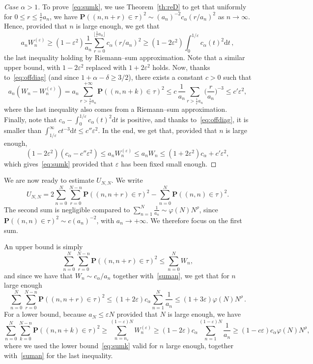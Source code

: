 \documentclass[AHL,Unicode,longabstracts]{cedram}
\newenvironment{step}[1]{\begin{proof}[#1]}{\let\qed\relax\end{proof}}
\newcommand{\ga}{\alpha}
\newcommand{\gd}{\delta}
\newcommand{\gep}{\varepsilon}
\newcommand{\dd}{\mathrm{d}}
\newcommand{\bP}{\ensuremath{\mathbf{P}}}
\begin{document}
\begin{appendix}
\begin{proofc}
\begin{step}{Case $\ga > 1$}
To prove~\eqref{eq:sumk}, we use Theorem~\ref{th:reD} to get that uniformly for $0\leq r\leq \tfrac 1\gep a_n$, we have $\bP((n,n+r) \in \tau)^2 \sim (a_n)^{-2} c_{\ga}(r/a_n)^2$ as $n\to\infty$. Hence, provided that $n$ is large enough, we get that
\[
a_n W_n^{(\gep)} \geq (1-\gep^2) \frac{1}{a_n} \sum_{r=0}^{\lfloor\frac1\gep a_n \rfloor} c_{\ga}(r/a_n)^2 \geq (1-2\gep^2) \int_{0}^{1/\gep} c_{\ga}(t)^2 \dd t\,,
\]
the last inequality holding by Riemann--sum approximation. Note that a similar upper bound, with $1-2\gep^2$ replaced with $1+2\gep^2$ holds. Now, thanks to~\eqref{eq:offdiag} (and since $1+\ga-\gd \geq 3/2$), there exists a constant $c>0$ such that
\[
a_n(W_n-W_n^{(\gep)}) = a_n \sum_{r > \frac1\gep a_n}^{+\infty} \bP((n,n+k) \in \tau)^2 \leq c\,\frac{1}{a_n} \sum_{r>\frac1\gep a_n} \Big(\frac{r}{a_n} \Big)^{-3} \leq c' \gep^2,
\]
where the last inequality also comes from a Riemann--sum approximation. Finally, note that $c_\ga -\int_{0}^{1/\gep} c_{\ga}(t)^2 \dd t $ is positive, and thanks to~\eqref{eq:offdiag}, it is smaller than $\int_{1/\gep}^{\infty} c t^{-3} \dd t \leq c'' \gep^2$. In the end, we get that, provided that $n$ is large enough,
\begin{equation}
(1-2\gep^2) (c_{\ga} - c'' \gep^2) \leq a_n W_n^{(\gep)} \leq a_n W_n \leq (1+2\gep^2) c_{\ga} + c' \gep^2,
\end{equation}
which gives~\eqref{eq:sumk} provided that $\gep$ has been fixed small enough.
\end{step}

We are now ready to estimate $U_{N,N}$. We write
\[
U_{N,N} = 2\sum_{n=0}^{N} \sum_{r=0}^{N-n} \bP((n,n+r) \in\tau)^2 - \sum_{n=0}^N \bP((n,n)\in\tau)^2.
\]
The second sum is negligible compared to $\sum_{n=1}^N \tfrac{1}{a_n}\sim \varphi(N) N^{\rho}$, since $\bP({(n,n)\in\tau})^2 \sim c (a_n)^{-2}$, with $a_n \to +\infty$. We therefore focus on the first sum.

An upper bound is simply
\[
\sum_{n=0}^N \sum_{r=0}^{N-n} \bP((n,n+r) \in\tau)^2 \leq \sum_{n=0}^N W_n,
\]
and since we have that $W_n \sim c_{\ga}/a_n$ together with~\eqref{suman}, we get that for $n$ large enough
\[
\sum_{n=0}^N \sum_{r=0}^{N-n} \bP((n,n+r) \in\tau)^2 \leq (1+2\gep) c_{\ga} \sum_{n=1}^N \frac{1}{a_n} \leq (1+3\gep) \varphi(N) N^{\rho}\,.
\]
For a lower bound, because $a_N\leq \gep N$ provided that $N$ is large enough, we have
\[
\sum_{n=0}^{N} \sum_{k=0}^{N-n} \bP((n,n+k) \in\tau)^2 \geq \sum_{n=n_{\gep}}^{(1-\gep) N} W_n^{(\gep)} \geq (1-2\gep) c_{\ga} \sum_{n=1}^{(1-\gep)N} \frac{1}{a_n} \geq (1- c\gep)c_{\ga} \varphi(N) N^{\rho},
\]
where we used the lower bound~\eqref{eq:sumk} valid for $n$ large enough, together with~\eqref{suman} for the last inequality.


\end{proofc}
\end{appendix}
\end{document}
